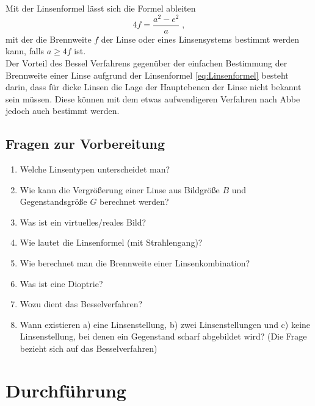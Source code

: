 \noindent
Mit der Linsenformel lässt sich die Formel ableiten
\begin{equation}
 4f = \frac{a^2 - e^2}{a}\; ,
\end{equation}
mit der die Brennweite $f$ der Linse oder eines Linsensystems bestimmt werden kann, falls $a \geq 4f$ ist.\\
Der Vorteil des Bessel Verfahrens gegenüber der einfachen Bestimmung der Brennweite einer Linse aufgrund der Linsenformel \ref{eq:Linsenformel} besteht darin, dass für dicke Linsen die Lage der Hauptebenen der Linse nicht bekannt sein müssen. Diese können mit dem etwas aufwendigeren Verfahren nach Abbe jedoch auch bestimmt werden.


\begin{tutorhint}
\section{Fragen zur Vorbereitung}

\begin{enumerate} 
%
 \item Welche Linsentypen unterscheidet man?
%
\item Wie kann die Vergrößerung einer Linse aus Bildgröße $B$ und Gegenstandsgröße $G$ berechnet werden?
%
\item Was ist ein virtuelles/reales Bild?
%
\item Wie lautet die Linsenformel (mit Strahlengang)?
%
\item Wie berechnet man die Brennweite einer Linsenkombination?
%
\item Was ist eine Dioptrie?
%
\item Wozu dient das Besselverfahren?
%
\item Wann existieren a) eine Linsenstellung, b) zwei Linsenstellungen und c) keine Linsenstellung, bei denen ein Gegenstand scharf abgebildet wird? (Die Frage bezieht sich auf das Besselverfahren)
\end{enumerate} 
\end{tutorhint}

\section{Durchführung} 

